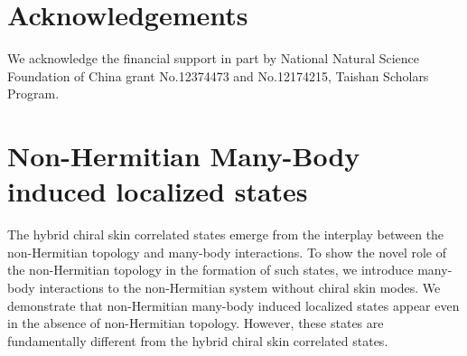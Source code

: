 \documentclass[longbibliography, aps, prx, amsmath, amssymb, amsfonts, twocolumn,superscriptaddress, footinbib]{revtex4-1}
\begin{document}
	\section*{Acknowledgements}
	We acknowledge the financial support in part by National Natural Science Foundation of China grant No.12374473 and No.12174215, Taishan Scholars Program.

	\appendix

	\section{Non-Hermitian Many-Body induced localized states\label{sec:NHMBL}}

	The hybrid chiral skin correlated states emerge from the interplay between the non-Hermitian topology and many-body interactions. To show the novel role of the non-Hermitian topology in the formation of such states, we introduce many-body interactions to the non-Hermitian system without chiral skin modes.
	We demonstrate that non-Hermitian many-body induced localized states appear even in the absence of non-Hermitian topology. However, these states are  fundamentally different from the hybrid chiral skin correlated states.
\end{document}
